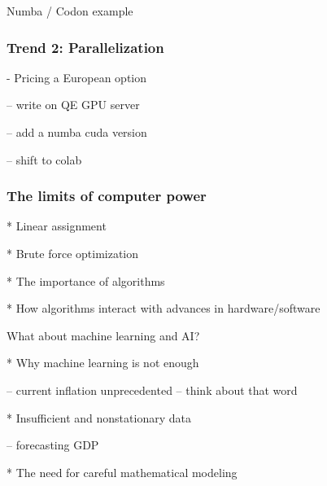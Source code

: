 \documentclass[
    xcolor={svgnames,dvipsnames},
    hyperref={colorlinks, citecolor=DeepPink4, linkcolor=DarkRed, urlcolor=DarkBlue}
    ]{beamer}  %
\newcommand{\1}{\mathbbm 1}
\begin{document}
\begin{frame}

    Numba / Codon example

\end{frame}




\begin{frame}
    \frametitle{Trend 2: Parallelization}
    
    - Pricing a European option 

        -- write on QE GPU server

        -- add a numba cuda version

        -- shift to colab

\end{frame}


\begin{frame}
    \frametitle{The limits of computer power}

    * Linear assignment

    * Brute force optimization
        
\end{frame}



\begin{frame}
    
    * The importance of algorithms

    * How algorithms interact with advances in hardware/software

\end{frame}

\begin{frame}

    What about machine learning and AI?

    * Why machine learning is not enough 

        -- current inflation unprecedented -- think about that word

    * Insufficient and nonstationary data 

        -- forecasting GDP

    * The need for careful mathematical modeling
    
\end{frame}
\end{document}
